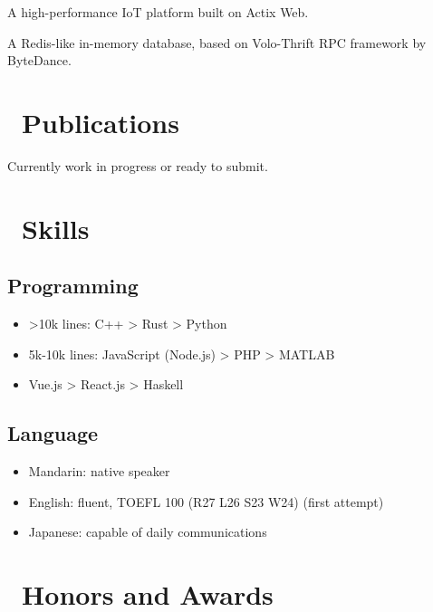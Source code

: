 \documentclass{resume}
\begin{document}
A high-performance IoT platform built on Actix Web.

A Redis-like in-memory database, based on Volo-Thrift RPC framework by ByteDance.

\section{\faBookmarkO\ Publications}
Currently work in progress or ready to submit.

\section{\faCogs\ Skills}
\subsection{\textbf{Programming}}
\begin{itemize}[itemsep=0.5ex]
  \item >10k lines: C++ > Rust > Python
  \item 5k-10k lines: JavaScript (Node.js) > PHP > MATLAB
  \item <5k lines: Java > Vue.js > React.js > Haskell
\end{itemize}
\subsection{\textbf{Language}}
\begin{itemize}[itemsep=0.5ex]
  \item Mandarin: native speaker
  \item English: fluent, TOEFL 100 (R27 L26 S23 W24) (first attempt)
  \item Japanese: capable of daily communications
\end{itemize}

\section{\faHeartO\ Honors and Awards}
\end{document}
